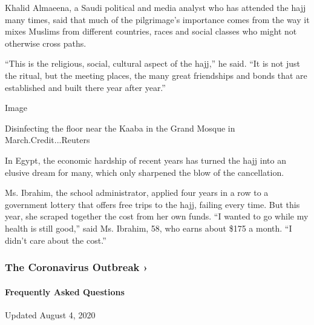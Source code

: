 Khalid Almaeena, a Saudi political and media analyst who has attended
the hajj many times, said that much of the pilgrimage's importance comes
from the way it mixes Muslims from different countries, races and social
classes who might not otherwise cross paths.

``This is the religious, social, cultural aspect of the hajj,'' he said.
``It is not just the ritual, but the meeting places, the many great
friendships and bonds that are established and built there year after
year.''

Image

Disinfecting the floor near the Kaaba in the Grand Mosque in
March.Credit...Reuters

In Egypt, the economic hardship of recent years has turned the hajj into
an elusive dream for many, which only sharpened the blow of the
cancellation.

Ms. Ibrahim, the school administrator, applied four years in a row to a
government lottery that offers free trips to the hajj, failing every
time. But this year, she scraped together the cost from her own funds.
``I wanted to go while my health is still good,'' said Ms. Ibrahim, 58,
who earns about \$175 a month. ``I didn't care about the cost.''

\href{https://www.nytimes3xbfgragh.onion/news-event/coronavirus?action=click\&pgtype=Article\&state=default\&region=MAIN_CONTENT_3\&context=storylines_faq}{}

\hypertarget{the-coronavirus-outbreak-}{%
\subsubsection{The Coronavirus Outbreak
›}\label{the-coronavirus-outbreak-}}

\hypertarget{frequently-asked-questions}{%
\paragraph{Frequently Asked
Questions}\label{frequently-asked-questions}}

Updated August 4, 2020

